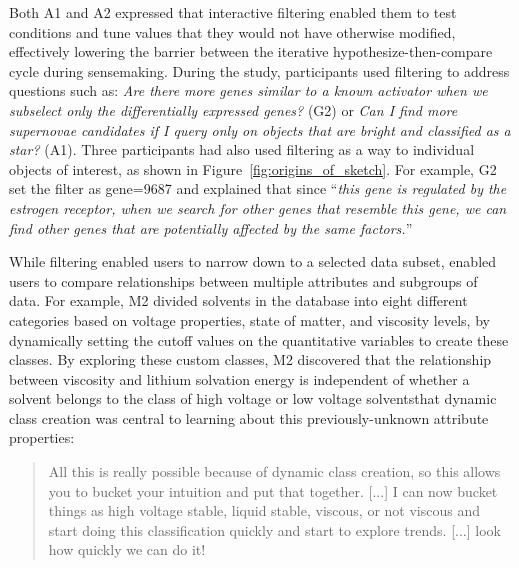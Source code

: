 \par Both A1 and A2 expressed that  interactive filtering enabled them to test conditions and tune values that they would not have otherwise modified, effectively lowering the barrier between the iterative hypothesize-then-compare cycle during sensemaking.
During the study, participants used filtering
to address questions such as:
\textit{Are there more genes similar
to a known activator when we subselect
only the differentially expressed genes?} (G2) or \textit{Can I find more supernovae candidates if I query only on objects that are bright and classified as a star?} (A1). Three participants had also used filtering as a way to  individual objects of interest, as shown in Figure~\ref{fig:origins_of_sketch}. For example, G2 set the filter as gene=9687 and explained that since ``\textit{this gene is regulated by the estrogen receptor, when we search for other genes that resemble this gene, we can find other genes that are potentially affected by the same factors.}''
\par While filtering enabled users to
narrow down to a selected data subset,
enabled users to compare
relationships between multiple attributes and subgroups of data.
For example, M2 divided solvents in the database
into eight different categories based on voltage properties,
state of matter, and viscosity levels,
by dynamically setting the cutoff values
on the quantitative variables to create these classes.
By exploring these custom classes, M2 discovered that the relationship between viscosity and lithium solvation energy is independent of whether a solvent belongs to the class of high voltage or low voltage solventsthat dynamic class creation was central to learning about this previously-unknown attribute properties:
\begin{quote}
All this is really possible because of dynamic class creation, so this allows you to bucket your intuition and put that together. [...] I can now bucket things as high voltage stable, liquid stable, viscous, or not viscous and start doing this classification quickly and start to explore trends. [...] look how quickly we can do it!%
\end{quote}
